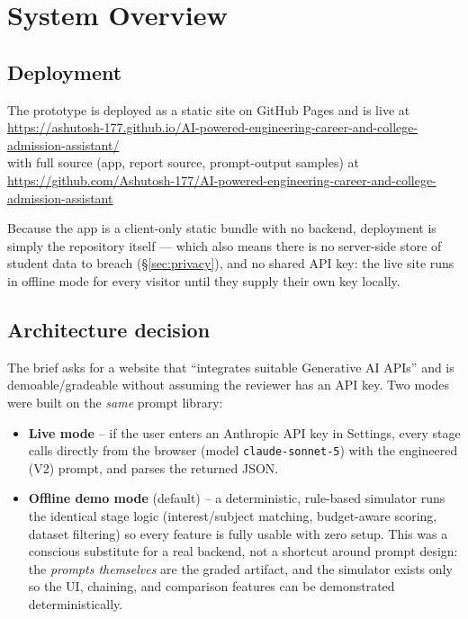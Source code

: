 \documentclass[11pt]{article}
\begin{document}
\section{System Overview}
\label{sec:system}

\subsection{Deployment}
The prototype is deployed as a static site on GitHub Pages and is live at\\
\url{https://ashutosh-177.github.io/AI-powered-engineering-career-and-college-admission-assistant/}\\
with full source (app, report source, prompt-output samples) at\\
\url{https://github.com/Ashutosh-177/AI-powered-engineering-career-and-college-admission-assistant}

\noindent Because the app is a client-only static bundle with no backend, deployment is simply the repository itself --- which also means there is no server-side store of student data to breach (\S\ref{sec:privacy}), and no shared API key: the live site runs in offline mode for every visitor until they supply their own key locally.

\subsection{Architecture decision}
The brief asks for a website that ``integrates suitable Generative AI APIs'' and is demoable/gradeable without assuming the reviewer has an API key. Two modes were built on the \emph{same} prompt library:

\begin{itemize}
\item \textbf{Live mode} -- if the user enters an Anthropic API key in Settings, every stage calls  directly from the browser (model \texttt{claude-sonnet-5}) with the engineered (V2) prompt, and parses the returned JSON.
\item \textbf{Offline demo mode} (default) -- a deterministic, rule-based simulator runs the identical stage logic (interest/subject matching, budget-aware scoring, dataset filtering) so every feature is fully usable with zero setup. This was a conscious substitute for a real backend, not a shortcut around prompt design: the \emph{prompts themselves} are the graded artifact, and the simulator exists only so the UI, chaining, and comparison features can be demonstrated deterministically.
\end{itemize}
\end{document}

